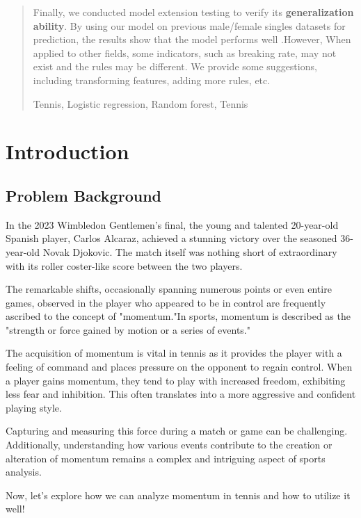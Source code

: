 \documentclass{mcmthesis}  %
\begin{document}
\begin{abstract}
\par Finally, we conducted model extension testing to verify its \textbf{generalization ability}. By using our model on previous male/female singles datasets for prediction, the results show that the model performs well .However, When applied to other fields, some indicators, such as breaking rate, may not exist and the rules may be different. We provide some suggestions, including transforming features, adding more rules, etc.

\begin{keywords}  %
Tennis, Logistic regression, Random forest, Tennis
\end{keywords}  %
\end{abstract}  %


\maketitle  %

\tableofcontents  %


\newpage  %
\section{Introduction}  %
\subsection{Problem Background}  %
\hspace{1.5em}In the 2023 Wimbledon Gentlemen's final, the young and talented 20-year-old Spanish player, Carlos Alcaraz, achieved a stunning victory over the seasoned 36-year-old Novak Djokovic. The match itself was nothing short of extraordinary with its roller coster-like score between the two players.
\par The remarkable shifts, occasionally spanning numerous points or even entire games, observed in the player who appeared to be in control are frequently ascribed to the concept of "momentum."In sports, momentum is described as the "strength or force gained by motion or a series of events."
\par The acquisition of momentum is vital in tennis as it provides the player with a feeling of command and places pressure on the opponent to regain control. When a player gains momentum, they tend to play with increased freedom, exhibiting less fear and inhibition. This often translates into a more aggressive and confident playing style. \cite{jesse2016}
\par Capturing and measuring this force during a match or game can be challenging. Additionally, understanding how various events contribute to the creation or alteration of momentum remains a complex and intriguing aspect of sports analysis.
\par Now, let's explore how we can analyze momentum in tennis and how to utilize it well!
\end{document}
